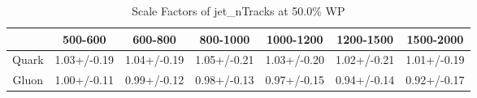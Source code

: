 \begin{table}
\centering
\caption{Scale Factors of jet_nTracks at 50.0\% WP}
\label{tab:jet_nTracks_0.5_Gluon}
\begin{tabular}{ccccccc}
\toprule
{} &      500-600 &      600-800 &     800-1000 &    1000-1200 &    1200-1500 &    1500-2000 \\
\midrule
Quark &  1.03+/-0.19 &  1.04+/-0.19 &  1.05+/-0.21 &  1.03+/-0.20 &  1.02+/-0.21 &  1.01+/-0.19 \\
Gluon &  1.00+/-0.11 &  0.99+/-0.12 &  0.98+/-0.13 &  0.97+/-0.15 &  0.94+/-0.14 &  0.92+/-0.17 \\
\bottomrule
\end{tabular}
\end{table}

